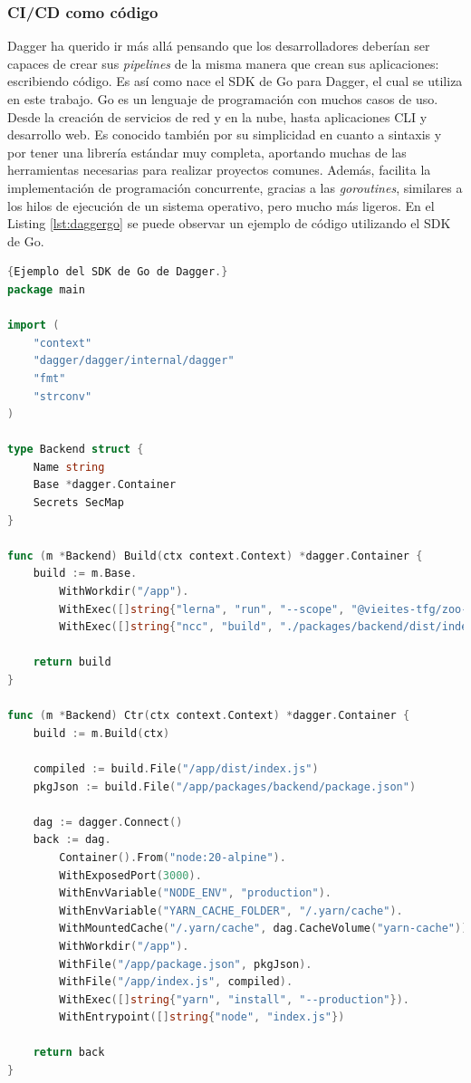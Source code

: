 \subsubsection*{CI/CD como código}
\label{subsec:cicd-code}

Dagger ha querido ir más allá pensando que los desarrolladores deberían ser capaces de crear sus \textit{pipelines} de la misma manera que crean sus aplicaciones: escribiendo código. Es así como nace el SDK de Go\cite{go} para Dagger, el cual se utiliza en este trabajo. Go es un lenguaje de programación con muchos casos de uso. Desde la creación de servicios de red y en la nube, hasta aplicaciones CLI y desarrollo web. Es conocido también por su simplicidad en cuanto a sintaxis y por tener una librería estándar muy completa, aportando muchas de las herramientas necesarias para realizar proyectos comunes. Además, facilita la implementación de programación concurrente, gracias a las \textit{goroutines}, similares a los hilos de ejecución de un sistema operativo, pero mucho más ligeros. En el Listing \ref{lst:daggergo} se puede observar un ejemplo de código utilizando el SDK de Go.

\begin{lstlisting}[language=go,label=lst:daggergo]{Ejemplo del SDK de Go de Dagger.}
package main

import (
	"context"
	"dagger/dagger/internal/dagger"
	"fmt"
	"strconv"
)

type Backend struct {
	Name string
	Base *dagger.Container
	Secrets SecMap
}

func (m *Backend) Build(ctx context.Context) *dagger.Container {
	build := m.Base.
		WithWorkdir("/app").
		WithExec([]string{"lerna", "run", "--scope", "@vieites-tfg/zoo-backend", "build"}).
		WithExec([]string{"ncc", "build", "./packages/backend/dist/index.js", "-o", "./dist"})

	return build
}

func (m *Backend) Ctr(ctx context.Context) *dagger.Container {
	build := m.Build(ctx)

	compiled := build.File("/app/dist/index.js")
	pkgJson := build.File("/app/packages/backend/package.json")

	dag := dagger.Connect()
	back := dag.
		Container().From("node:20-alpine").
		WithExposedPort(3000).
		WithEnvVariable("NODE_ENV", "production").
		WithEnvVariable("YARN_CACHE_FOLDER", "/.yarn/cache").
		WithMountedCache("/.yarn/cache", dag.CacheVolume("yarn-cache")).
		WithWorkdir("/app").
		WithFile("/app/package.json", pkgJson).
		WithFile("/app/index.js", compiled).
		WithExec([]string{"yarn", "install", "--production"}).
		WithEntrypoint([]string{"node", "index.js"})

	return back
}
\end{lstlisting}

